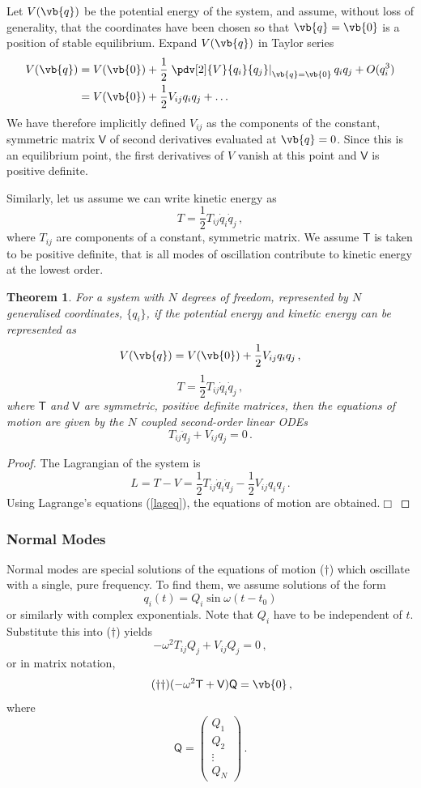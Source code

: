 \documentclass{article}
\theoremstyle{plain}\theoremheaderfont{\normalfont\itshape}\theorembodyfont{\rmfamily}\theoremseparator{.}\newtheorem*{rem}{Remark}\newtheorem*{ex}{Example}\newtheorem*{proof}{Proof}\newtheorem*{altp}{Alternative proof}
\theoremstyle{plain}\theoremheaderfont{\normalfont\bfseries}\theorembodyfont{\rmfamily}\theoremseparator{.}\newtheorem{thm}{Theorem}[section]\newtheorem{lem}[thm]{Lemma}\newtheorem{prop}[thm]{Proposition}\newtheorem*{cor}{Corollary}\newtheorem{defn}[thm]{Definition}\newtheorem{clm}[thm]{Claim}\newtheorem{clminproof}{Claim}
\theoremstyle{break}\theoremheaderfont{\normalfont\itshape}\theorembodyfont{\rmfamily}\theoremseparator{.\medskip}\newtheorem*{proofskip}{Proof}\newtheorem*{exs}{Examples}\newtheorem*{rems}{Remarks}
\theoremstyle{break}\theoremheaderfont{\normalfont\bfseries}\theorembodyfont{\rmfamily}\theoremseparator{.\medskip}\newtheorem{lemskip}[thm]{Lemma}\newtheorem{defnskip}[thm]{Definition}\newtheorem{propskip}[thm]{Proposition}\newtheorem{thmskip}[thm]{Theorem}
\numberwithin{equation}{section}
\newcommand{\qed}{\hfill\ensuremath{\Box}}
\begin{document}
	Let \(V(\vb{q})\) be the potential energy of the system, and assume, without loss of generality, that the coordinates have been chosen so that \(\vb{q}=\vb{0}\) is a position of stable equilibrium. Expand \(V(\vb{q})\) in Taylor series
	\begin{align*}
		V(\vb{q})&=V(\vb{0})+\frac{1}{2}\left.\pdv[2]{V}{q_i}{q_j}\right|_{\vb{q}=\vb{0}}q_iq_j+O(q_i^3)\\
		&=V(\vb{0})+\frac{1}{2}V_{ij}q_iq_j+\dots
	\end{align*}
	We have therefore implicitly defined \(V_{ij}\) as the components of the constant, symmetric matrix \(\mathsf{V}\) of second derivatives evaluated at \(\vb{q}=0\). Since this is an equilibrium point, the first derivatives of \(V\) vanish at this point and \(\mathsf{V}\) is positive definite.

	Similarly, let us assume we can write kinetic energy as
	\[T=\frac{1}{2}T_{ij}\dot{q}_i\dot{q}_j\,,\]
	where \(T_{ij}\) are components of a constant, symmetric matrix. We assume \(\mathsf{T}\) is taken to be positive definite, that is all modes of oscillation contribute to kinetic energy at the lowest order.

	\begin{thm}
		For a system with \(N\) degrees of freedom, represented by \(N\) generalised coordinates, \(\{q_i\}\), if the potential energy and kinetic energy can be represented as
		\[V(\vb{q})=V(\vb{0})+\frac{1}{2}V_{ij}q_iq_j\,,\]
		\[T=\frac{1}{2}T_{ij}\dot{q}_i\dot{q}_j\,,\]
		where \(\mathsf{T}\) and \(\mathsf{V}\) are symmetric, positive definite matrices, then the equations of motion are given by the \(N\) coupled second-order linear ODEs
		\begin{equation}\tag{\(\dagger\)}
			T_{ij}\ddot{q}_j+V_{ij}q_j=0\,.
		\end{equation}
	\end{thm}
	\begin{proof}
		The Lagrangian of the system is
		\[L=T-V=\frac{1}{2}T_{ij}\dot{q}_i\dot{q}_j-\frac{1}{2}V_{ij}q_iq_j\,.\]
		Using Lagrange's equations (\cref{lageq}), the equations of motion are obtained.\qed
	\end{proof}
	\subsubsection{Normal Modes}
	Normal modes are special solutions of the equations of motion (\(\dagger\)) which oscillate with a single, pure frequency. To find them, we assume solutions of the form
	\[q_i(t)=Q_i\sin\omega(t-t_0)\]
	or similarly with complex exponentials. Note that \(Q_i\) have to be independent of \(t\). Substitute this into (\(\dagger\)) yields
	\[-\omega^2T_{ij}Q_j+V_{ij}Q_j=0\,,\]
	or in matrix notation,
	\begin{equation}\tag{\(\dagger\dagger\)}
		(-\omega^2\mathsf{T}+\mathsf{V})\mathsf{Q}=\vb{0}\,,
	\end{equation}
	where
	\[\mathsf{Q}=\begin{pmatrix}
		Q_1 \\ Q_2 \\ \vdots \\ Q_N
	\end{pmatrix}\,.\]
\end{document}
